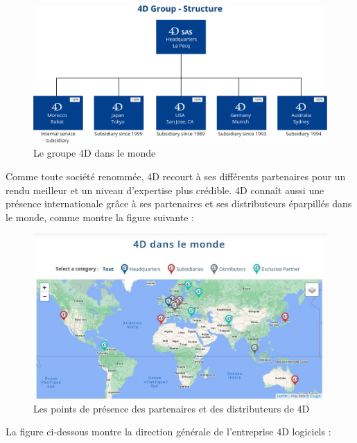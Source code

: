 \begin{figure}[h]
    \centering
    \includegraphics[scale=0.35]{Figures/groupe.png} %
    \caption{Le groupe 4D dans le monde}
    \label{fig:groupe}
\end{figure}

Comme toute société renommée, 4D recourt à ses différents partenaires 
pour un rendu meilleur et un niveau d’expertise plus crédible. 4D connaît aussi 
une présence internationale grâce à ses partenaires et ses distributeurs éparpillés 
dans le monde, comme montre la figure suivante :

\begin{figure}[h]
    \centering
    \includegraphics[scale=0.6]{Figures/carte.jpg} %
    \caption{Les points de présence des partenaires et des distributeurs de 4D \cite{4Dhistory}}
    \label{fig:carte}
\end{figure}

\vspace{6cm}

La figure ci-dessous montre la direction générale de l’entreprise 4D logiciels :



